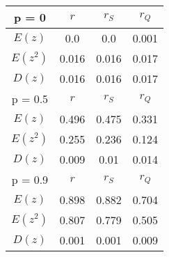 \begin{tabular}{| c | c | c | c |} \hline 
 p = 0 & $r$ & $r_{S}$ & $r_{Q}$ \\ \hline 
 $E(z)$ & 0.0 & 0.0 & 0.001 \\ \hline 
 $E(z^2)$ & 0.016 & 0.016 & 0.017 \\ \hline 
 $D(z)$ & 0.016 & 0.016 & 0.017 \\ \hline 
 p = 0.5 & $r$ & $r_{S}$ & $r_{Q}$ \\ \hline 
 $E(z)$ & 0.496 & 0.475 & 0.331 \\ \hline 
 $E(z^2)$ & 0.255 & 0.236 & 0.124 \\ \hline 
 $D(z)$ & 0.009 & 0.01 & 0.014 \\ \hline 
 p = 0.9 & $r$ & $r_{S}$ & $r_{Q}$ \\ \hline 
 $E(z)$ & 0.898 & 0.882 & 0.704 \\ \hline 
 $E(z^2)$ & 0.807 & 0.779 & 0.505 \\ \hline 
 $D(z)$ & 0.001 & 0.001 & 0.009 \\ \hline 
 \end{tabular} 
